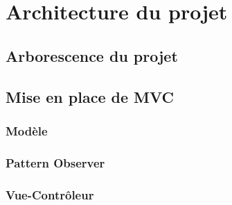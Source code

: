 \chapter{Architecture du projet}

	\section{Arborescence du projet}



	\section{Mise en place de MVC}

		\subsection{Modèle}



		\subsection{Pattern Observer}



		\subsection{Vue-Contrôleur}
